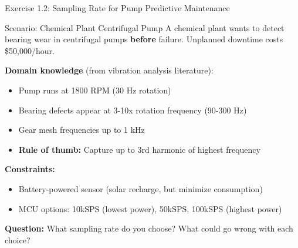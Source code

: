 \documentclass[aspectratio=169,11pt]{beamer}
\begin{document}
\begin{frame}{Exercise 1.2: Sampling Rate for Pump Predictive Maintenance}
    \begin{block}{Scenario: Chemical Plant Centrifugal Pump}
        A chemical plant wants to detect bearing wear in centrifugal pumps \textbf{before} failure. Unplanned downtime costs \$50,000/hour.
        
        \vspace{0.2cm}
        \textbf{Domain knowledge} (from vibration analysis literature):
        \begin{itemize}
            \item Pump runs at 1800 RPM (30 Hz rotation)
            \item Bearing defects appear at 3-10x rotation frequency (90-300 Hz)
            \item Gear mesh frequencies up to 1 kHz
            \item \textbf{Rule of thumb:} Capture up to 3rd harmonic of highest frequency
        \end{itemize}
        
        \vspace{0.2cm}
        \textbf{Constraints:}
        \begin{itemize}
            \item Battery-powered sensor (solar recharge, but minimize consumption)
            \item MCU options: 10kSPS (lowest power), 50kSPS, 100kSPS (highest power)
        \end{itemize}
    \end{block}
    
    \textbf{Question:} What sampling rate do you choose? What could go wrong with each choice?
\end{frame}
\end{document}
